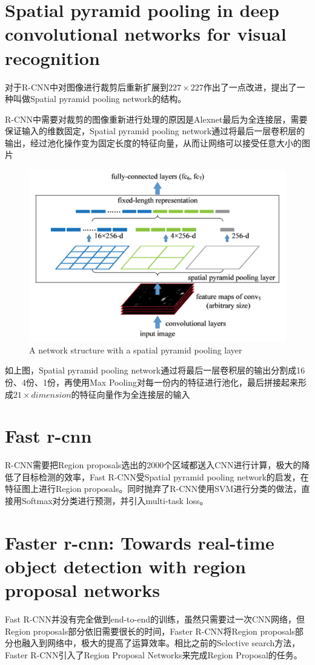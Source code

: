 \documentclass[12pt,onecolumn]{article}
\begin{document}
    \section{Spatial pyramid pooling in deep convolutional networks for visual recognition\cite{he2015spatial}}
    对于R-CNN中对图像进行裁剪后重新扩展到$227\times 227$作出了一点改进，提出了一种叫做Spatial pyramid pooling network的结构。\par 
    R-CNN中需要对裁剪的图像重新进行处理的原因是Alexnet最后为全连接层，需要保证输入的维数固定，Spatial pyramid pooling network通过将最后一层卷积层的输出，经过池化操作变为固定长度的特征向量，从而让网络可以接受任意大小的图片
    \begin{figure}[h]
        \centering
        \includegraphics[width=\linewidth]{figure/spp.png}
        \caption{A network structure with a spatial pyramid pooling layer}
    \end{figure}
    如上图，Spatial pyramid pooling network通过将最后一层卷积层的输出分割成16份、4份、1份，再使用Max Pooling对每一份内的特征进行池化，最后拼接起来形成$21\times dimension$的特征向量作为全连接层的输入
    
    \section{Fast r-cnn\cite{girshick2015fast}}
    R-CNN需要把Region proposals选出的2000个区域都送入CNN进行计算，极大的降低了目标检测的效率，Fast R-CNN受Spatial pyramid pooling network的启发，在特征图上进行Region proposals。同时抛弃了R-CNN使用SVM进行分类的做法，直接用Softmax对分类进行预测，并引入multi-task loss。

    \section{Faster r-cnn: Towards real-time object detection with region proposal networks\cite{ren2015faster}}
    Fast R-CNN并没有完全做到end-to-end的训练，虽然只需要过一次CNN网络，但Region proposals部分依旧需要很长的时间，Faster R-CNN将Region proposals部分也融入到网络中，极大的提高了运算效率。相比之前的Selective search方法，Faster R-CNN引入了Region Proposal Networks来完成Region Proposal的任务。
\end{document}
